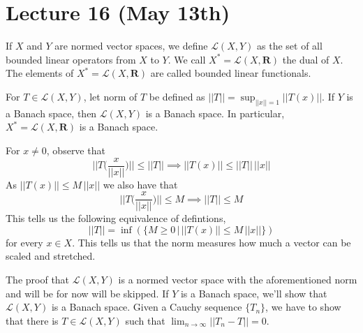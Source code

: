 \section{Lecture 16 (May 13th)}
\begin{defi}
If $X$ and $Y$ are normed vector spaces, we define $\mathcal{L}(X,Y)$ as the set of all bounded linear operators from $X$ to $Y$. We call $X^{*}=\mathcal{L}(X,{\bm R})$ the dual of $X$. The elements of $X^{*}=\mathcal{L}(X,{\bm R})$ are called bounded linear functionals. 
\end{defi}
\vspace{2ex}
\begin{thm}
For $T\in \mathcal{L}(X,Y)$, let norm of $T$ be defined as $||T||=\sup_{||x||=1}||T(x)|| $. If $Y$ is a Banach space, then $\mathcal{L}(X,Y)$ is a Banach space. In particular, $X^{*}=\mathcal{L}(X,{\bm R})$ is a Banach space.
\end{thm}
\vspace{2ex}
\begin{rmk}
For $x\ne 0$, observe that 
\[\Big|\Big|T\Big(\dfrac{x}{||x||}\Big)\Big|\Big|\leq ||T||\implies ||T(x)||\leq ||T||\, ||x||\]
As $||T(x)||\leq M\,||x||$ we also have that 
\[\Big|\Big|T\Big(\dfrac{x}{||x||}\Big)\Big|\Big|\leq M\implies ||T||\leq M\]
This tells us the following equivalence of defintions, 
\[||T||=\inf(\{M\geq 0 \,|\,||T(x)||\leq M\,||x|| \}) \]
for every $x\in X$. This tells us that the norm measures how much a vector can be scaled and stretched. 
\end{rmk}
\vspace{2ex}
\begin{thm}
The proof that $\mathcal{L}(X,Y)$ is a normed vector space with the aforementioned norm and will be for now will be skipped. If $Y$ is a Banach space, we'll show that $\mathcal{L}(X,Y)$ is a Banach space. Given a Cauchy sequence $\{T_{n}\}$, we have to show that there is $T\in \mathcal{L}(X,Y)$ such that $\lim _{n\rightarrow \infty }||T_{n}-T||=0$. 
\end{thm}
\vspace{2ex}

